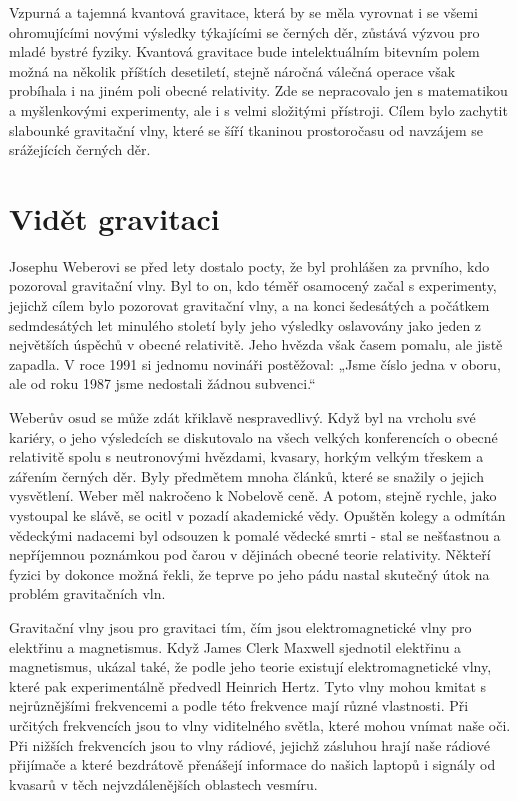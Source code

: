   Vzpurná a tajemná kvantová gravitace, která by se měla vyrovnat i se všemi ohromujícími novými
  výsledky týkajícími se černých děr, zůstává výzvou pro mladé bystré fyziky. Kvantová gravitace
  bude intelektuálním bitevním polem možná na několik příštích desetiletí, stejně náročná válečná
  operace však probíhala i na jiném poli obecné relativity. Zde se nepracovalo jen s matematikou a
  myšlenkovými experimenty, ale i s velmi složitými přístroji. Cílem bylo zachytit slabounké
  gravitační vlny, které se šíří tkaninou prostoročasu od navzájem se srážejících černých děr. 

\section{Vidět gravitaci}\label{feyIchIIIsecXI} 
  Josephu Weberovi se před lety dostalo pocty, že byl prohlášen za prvního, kdo pozoroval gravitační
  vlny. Byl to on, kdo téměř osamocený začal s experimenty, jejichž cílem bylo pozorovat gravitační
  vlny, a na konci šedesátých a počátkem sedmdesátých let minulého století byly jeho výsledky
  oslavovány jako jeden z největších úspěchů v obecné relativitě. Jeho hvězda však časem pomalu, ale
  jistě zapadla. V roce 1991 si jednomu novináři postěžoval: „Jsme číslo jedna v oboru, ale od roku
  1987 jsme nedostali žádnou subvenci.“

  Weberův osud se může zdát křiklavě nespravedlivý. Když byl na vrcholu své kariéry, o jeho
  výsledcích se diskutovalo na všech velkých konferencích o obecné relativitě spolu s neutronovými
  hvězdami, kvasary, horkým velkým třeskem a zářením černých děr. Byly předmětem mnoha článků, které
  se snažily o jejich vysvětlení. Weber měl nakročeno k Nobelově ceně. A potom, stejně rychle, jako
  vystoupal ke slávě, se ocitl v pozadí akademické vědy. Opuštěn kolegy a odmítán vědeckými nadacemi
  byl odsouzen k pomalé vědecké smrti - stal se nešťastnou a nepříjemnou poznámkou pod čarou v
  dějinách obecné teorie relativity. Někteří fyzici by dokonce možná řekli, že teprve po jeho pádu
  nastal skutečný útok na problém gravitačních vln. 

  Gravitační vlny jsou pro gravitaci tím, čím jsou elektromagnetické vlny pro elektřinu a
  magnetismus. Když James Clerk Maxwell sjednotil elektřinu a magnetismus, ukázal také, že podle
  jeho teorie existují elektromagnetické vlny, které pak experimentálně předvedl Heinrich Hertz.
  Tyto vlny mohou kmitat s nejrůznějšími frekvencemi a podle této frekvence mají různé vlastnosti.
  Při určitých frekvencích jsou to vlny viditelného světla, které mohou vnímat naše oči. Při nižších
  frekvencích jsou to vlny rádiové, jejichž zásluhou hrají naše rádiové přijímače a které bezdrátově
  přenášejí informace do našich laptopů i signály od kvasarů v těch nejvzdálenějších oblastech
  vesmíru. 

